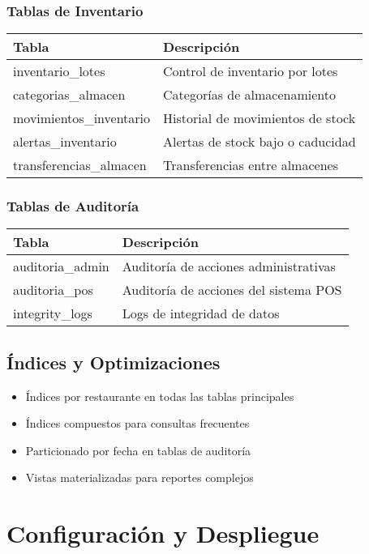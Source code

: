 \documentclass[12pt,a4paper]{article}
\begin{document}
\subsubsection{Tablas de Inventario}
\begin{longtable}{|p{3cm}|p{10cm}|}
\hline
\textbf{Tabla} & \textbf{Descripción} \\
\hline
\endhead
inventario\_lotes & Control de inventario por lotes \\
\hline
categorias\_almacen & Categorías de almacenamiento \\
\hline
movimientos\_inventario & Historial de movimientos de stock \\
\hline
alertas\_inventario & Alertas de stock bajo o caducidad \\
\hline
transferencias\_almacen & Transferencias entre almacenes \\
\hline
\end{longtable}

\subsubsection{Tablas de Auditoría}
\begin{longtable}{|p{3cm}|p{10cm}|}
\hline
\textbf{Tabla} & \textbf{Descripción} \\
\hline
\endhead
auditoria\_admin & Auditoría de acciones administrativas \\
\hline
auditoria\_pos & Auditoría de acciones del sistema POS \\
\hline
integrity\_logs & Logs de integridad de datos \\
\hline
\end{longtable}

\subsection{Índices y Optimizaciones}
\begin{itemize}
    \item Índices por restaurante en todas las tablas principales
    \item Índices compuestos para consultas frecuentes
    \item Particionado por fecha en tablas de auditoría
    \item Vistas materializadas para reportes complejos
\end{itemize}

\section{Configuración y Despliegue}
\end{document}
